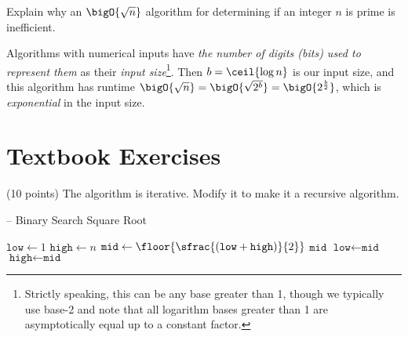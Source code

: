 \documentclass[final]{article}
\begin{document}
\begin{question}
    Explain why an $\bigO{\sqrt{n}}$ algorithm for determining if an integer $n$ is prime is inefficient.
\end{question}

\begin{solution}
    Algorithms with numerical inputs have \emph{the number of digits (bits) used to represent them} as their \emph{input size}\footnote{Strictly speaking, this can be any base greater than 1, though we typically use base-2 and note that all logarithm bases greater than 1 are asymptotically equal up to a constant factor.}. Then $b = \ceil{\log{n}}$ is our input size, and this algorithm has runtime $\bigO{\sqrt{n}} = \bigO{\sqrt{2^b}} = \bigO{2^{\frac{b}{2}}}$, which is \emph{exponential} in the input size.
\end{solution}

\section{Textbook Exercises}
\begin{exercise}{2.3}
(10 points)
    The algorithm  is iterative. Modify it to make it a recursive algorithm.
    

    \begin{algorithm}[H]
        \caption[]{ -- Binary Search Square Root}
        \label{alg:binsqrt}
        \begin{algorithmic}[1]
            \State $\texttt{low} \gets 1$   
            \State $\texttt{high} \gets n$  
            \While{\True}
            \State $\texttt{mid} \gets \floor{\sfrac{(\texttt{low} + \texttt{high})}{2}}$   
            \State \Return $\texttt{mid}$
             
            \State $\texttt{low} \gets \texttt{mid}$
            \Else {}
            \State $\texttt{high} \gets \texttt{mid}$
            \EndIf
            \EndWhile
            \EndFunction
        \end{algorithmic}
    \end{algorithm}
\end{exercise}
\end{document}
